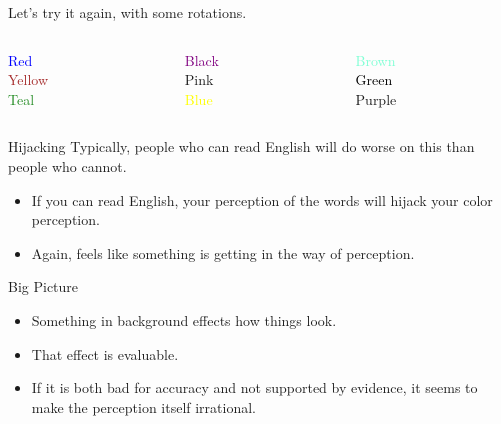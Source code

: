 \documentclass[
  17pt,
  letterpaper,
  ignorenonframetext,
  aspectratio=169,
  handout,
  xcolor={dvipsnames}]{beamer}
\providecommand{\tightlist}{%
  \setlength{\itemsep}{0pt}\setlength{\parskip}{0pt}}\usepackage{longtable,booktabs,array}
\begin{document}
\begin{frame}[plain]
Let's try it again, with some rotations.

\end{frame} \begin{frame}[plain]

\begin{columns}[T]
\begin{column}{0.25\textwidth}
\LARGE{ \textcolor{Blue}{Red} \\ \textcolor{Brown}{Yellow}  \\ \textcolor{ForestGreen}{Teal} }
\end{column}

\begin{column}{0.25\textwidth}
\LARGE{  \textcolor{Purple}{Black}    \\  \textcolor{BrickRed}{Pink}    \\     \textcolor{Yellow}{Blue} }
\end{column}

\begin{column}{0.25\textwidth}
\LARGE{  \textcolor{Aquamarine}{Brown} \\  \textcolor{Black}{Green} \\  \textcolor{Rhodamine}{Purple} }
\end{column}
\end{columns}
\end{frame}

\begin{frame}{Hijacking}
\protect\hypertarget{hijacking}{}
Typically, people who can read English will do worse on this than people
who cannot.

\begin{itemize}[<+->]
\tightlist
\item
  If you can read English, your perception of the words will hijack your
  color perception.
\item
  Again, feels like something is getting in the way of perception.
\end{itemize}
\end{frame}

\begin{frame}{Big Picture}
\protect\hypertarget{big-picture}{}
\begin{itemize}[<+->]
\tightlist
\item
  Something in background effects how things look.
\item
  That effect is evaluable.
\item
  If it is both bad for accuracy and not supported by evidence, it seems
  to make the perception itself irrational.
\end{itemize}
\end{frame}
\end{document}
